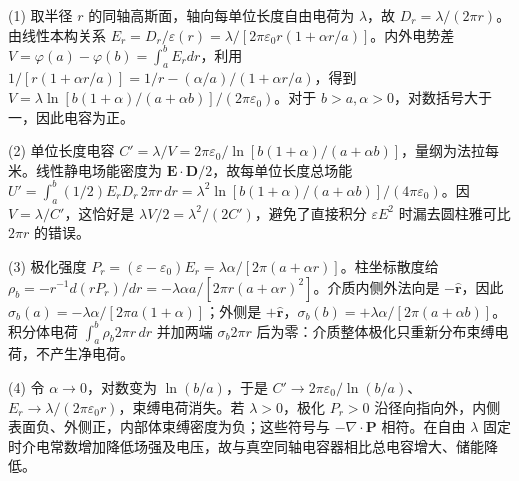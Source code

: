 (1) 取半径 \(r\) 的同轴高斯面，轴向每单位长度自由电荷为 \(\lambda\)，故 \(D_r=\lambda/(2\pi r)\)。由线性本构关系 \(E_r=D_r/\varepsilon(r)=\lambda/[2\pi\varepsilon_0r(1+\alpha r/a)]\)。内外电势差 \(V=\varphi(a)-\varphi(b)=\int_a^bE_rdr\)，利用 \(1/[r(1+\alpha r/a)]=1/r-(\alpha/a)/(1+\alpha r/a)\)，得到 \(V=\lambda\ln[b(1+\alpha)/(a+\alpha b)]/(2\pi\varepsilon_0)\)。对于 \(b>a,\alpha>0\)，对数括号大于一，因此电容为正。

(2) 单位长度电容 \(C'=\lambda/V=2\pi\varepsilon_0/\ln[b(1+\alpha)/(a+\alpha b)]\)，量纲为法拉每米。线性静电场能密度为 \(\mathbf E\cdot\mathbf D/2\)，故每单位长度总场能 \(U'=\int_a^b(1/2)E_rD_r\,2\pi r\,dr=\lambda^2\ln[b(1+\alpha)/(a+\alpha b)]/(4\pi\varepsilon_0)\)。因 \(V=\lambda/C'\)，这恰好是 \(\lambda V/2=\lambda^2/(2C')\)，避免了直接积分 \(\varepsilon E^2\) 时漏去圆柱雅可比 \(2\pi r\) 的错误。

(3) 极化强度 \(P_r=(\varepsilon-\varepsilon_0)E_r=\lambda\alpha/[2\pi(a+\alpha r)]\)。柱坐标散度给 \(\rho_b=-r^{-1}d(rP_r)/dr=-\lambda\alpha a/[2\pi r(a+\alpha r)^2]\)。介质内侧外法向是 \(-\hat{\mathbf r}\)，因此 \(\sigma_b(a)=-\lambda\alpha/[2\pi a(1+\alpha)]\)；外侧是 \(+\hat{\mathbf r}\)，\(\sigma_b(b)=+\lambda\alpha/[2\pi(a+\alpha b)]\)。积分体电荷 \(\int_a^b\rho_b2\pi r\,dr\) 并加两端 \(\sigma_b 2\pi r\) 后为零：介质整体极化只重新分布束缚电荷，不产生净电荷。

(4) 令 \(\alpha\to0\)，对数变为 \(\ln(b/a)\)，于是 \(C'\to2\pi\varepsilon_0/\ln(b/a)\)、\(E_r\to\lambda/(2\pi\varepsilon_0r)\)，束缚电荷消失。若 \(\lambda>0\)，极化 \(P_r>0\) 沿径向指向外，内侧表面负、外侧正，内部体束缚密度为负；这些符号与 \(-\nabla\cdot\mathbf P\) 相符。在自由 \(\lambda\) 固定时介电常数增加降低场强及电压，故与真空同轴电容器相比总电容增大、储能降低。
